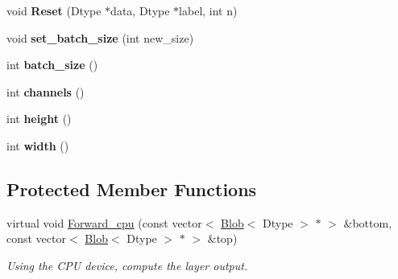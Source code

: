 \begin{DoxyCompactItemize}
\item 
void {\bfseries Reset} (Dtype $\ast$data, Dtype $\ast$label, int n)\hypertarget{classcaffe_1_1MemoryDataLayer_aeaa745c4fe3a957b973bf94dca6a5f2b}{}\label{classcaffe_1_1MemoryDataLayer_aeaa745c4fe3a957b973bf94dca6a5f2b}

\item 
void {\bfseries set\+\_\+batch\+\_\+size} (int new\+\_\+size)\hypertarget{classcaffe_1_1MemoryDataLayer_a07bc96b979032d11a0bf00fad6a3f1ff}{}\label{classcaffe_1_1MemoryDataLayer_a07bc96b979032d11a0bf00fad6a3f1ff}

\item 
int {\bfseries batch\+\_\+size} ()\hypertarget{classcaffe_1_1MemoryDataLayer_a06bfb6d06f61db11699a6b3ce7b1ee53}{}\label{classcaffe_1_1MemoryDataLayer_a06bfb6d06f61db11699a6b3ce7b1ee53}

\item 
int {\bfseries channels} ()\hypertarget{classcaffe_1_1MemoryDataLayer_aeeed090aee729e61426525c6a62f79a2}{}\label{classcaffe_1_1MemoryDataLayer_aeeed090aee729e61426525c6a62f79a2}

\item 
int {\bfseries height} ()\hypertarget{classcaffe_1_1MemoryDataLayer_a13775655bc0563ec85f124604ebb945f}{}\label{classcaffe_1_1MemoryDataLayer_a13775655bc0563ec85f124604ebb945f}

\item 
int {\bfseries width} ()\hypertarget{classcaffe_1_1MemoryDataLayer_a2c8b2f60895130d3ebfdc775724b5503}{}\label{classcaffe_1_1MemoryDataLayer_a2c8b2f60895130d3ebfdc775724b5503}

\end{DoxyCompactItemize}
\subsection*{Protected Member Functions}
\begin{DoxyCompactItemize}
\item 
virtual void \hyperlink{classcaffe_1_1MemoryDataLayer_a375e09cfb9898bf5e99f56d3316d0ded}{Forward\+\_\+cpu} (const vector$<$ \hyperlink{classcaffe_1_1Blob}{Blob}$<$ Dtype $>$ $\ast$ $>$ \&bottom, const vector$<$ \hyperlink{classcaffe_1_1Blob}{Blob}$<$ Dtype $>$ $\ast$ $>$ \&top)\hypertarget{classcaffe_1_1MemoryDataLayer_a375e09cfb9898bf5e99f56d3316d0ded}{}\label{classcaffe_1_1MemoryDataLayer_a375e09cfb9898bf5e99f56d3316d0ded}

\begin{DoxyCompactList}\small\item\em Using the C\+PU device, compute the layer output. \end{DoxyCompactList}\end{DoxyCompactItemize}
